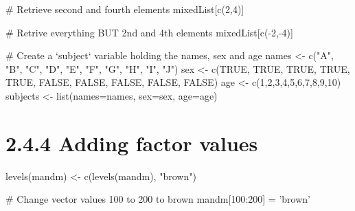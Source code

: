 \documentclass[a4paper]{book}
\newenvironment{Shaded}{}{}
\newcommand{\KeywordTok}[1]{\textcolor[rgb]{0.00,0.00,1.00}{{#1}}}
\newcommand{\DataTypeTok}[1]{{#1}}
\newcommand{\DecValTok}[1]{{#1}}
\newcommand{\StringTok}[1]{\textcolor[rgb]{0.00,0.50,0.50}{{#1}}}
\newcommand{\CommentTok}[1]{\textcolor[rgb]{0.00,0.50,0.00}{{#1}}}
\newcommand{\OtherTok}[1]{\textcolor[rgb]{1.00,0.25,0.00}{{#1}}}
\newcommand{\NormalTok}[1]{{#1}}
\newlength{\leftbarwidth}
\newlength{\leftbarsep}
\newcommand*{\leftbarcolorcmd}{\color{darkgray}}%
\renewenvironment{leftbar}{%
    \def\FrameCommand{{\leftbarcolorcmd{\vrule width \leftbarwidth\relax\hspace {\leftbarsep}}}}%
    \MakeFramed {\advance \hsize -\width \FrameRestore }%
}{%
    \endMakeFramed
}
\renewenvironment{Shaded}
{\vspace{0em}\begin{leftbar}\begin{snugshade}}
{\end{snugshade}\end{leftbar}\vspace{0pt}}
\begin{document}
\begin{Shaded}
\begin{Highlighting}[]
\CommentTok{# Retrieve second and fourth elements}
\NormalTok{mixedList[}\KeywordTok{c}\NormalTok{(}\DecValTok{2}\NormalTok{,}\DecValTok{4}\NormalTok{)]}

\CommentTok{# Retrive everything BUT 2nd and 4th elements}
\NormalTok{mixedList[}\KeywordTok{c}\NormalTok{(-}\DecValTok{2}\NormalTok{,-}\DecValTok{4}\NormalTok{)]}

\CommentTok{# Create a `subject` variable holding the names, sex and age}
\NormalTok{names <-}\StringTok{ }\KeywordTok{c}\NormalTok{(}\StringTok{"A"}\NormalTok{, }\StringTok{"B"}\NormalTok{, }\StringTok{"C"}\NormalTok{, }\StringTok{"D"}\NormalTok{, }\StringTok{"E"}\NormalTok{, }\StringTok{"F"}\NormalTok{, }\StringTok{"G"}\NormalTok{, }\StringTok{"H"}\NormalTok{, }\StringTok{"I"}\NormalTok{, }\StringTok{"J"}\NormalTok{)}
\NormalTok{sex <-}\StringTok{ }\KeywordTok{c}\NormalTok{(}\OtherTok{TRUE}\NormalTok{, }\OtherTok{TRUE}\NormalTok{, }\OtherTok{TRUE}\NormalTok{, }\OtherTok{TRUE}\NormalTok{, }\OtherTok{TRUE}\NormalTok{, }\OtherTok{FALSE}\NormalTok{, }\OtherTok{FALSE}\NormalTok{, }\OtherTok{FALSE}\NormalTok{, }\OtherTok{FALSE}\NormalTok{, }\OtherTok{FALSE}\NormalTok{)}
\NormalTok{age <-}\StringTok{ }\KeywordTok{c}\NormalTok{(}\DecValTok{1}\NormalTok{,}\DecValTok{2}\NormalTok{,}\DecValTok{3}\NormalTok{,}\DecValTok{4}\NormalTok{,}\DecValTok{5}\NormalTok{,}\DecValTok{6}\NormalTok{,}\DecValTok{7}\NormalTok{,}\DecValTok{8}\NormalTok{,}\DecValTok{9}\NormalTok{,}\DecValTok{10}\NormalTok{)}
\NormalTok{subjects <-}\StringTok{ }\KeywordTok{list}\NormalTok{(}\DataTypeTok{names=}\NormalTok{names, }\DataTypeTok{sex=}\NormalTok{sex, }\DataTypeTok{age=}\NormalTok{age)}
\end{Highlighting}
\end{Shaded}

\section*{2.4.4 Adding factor values}\label{adding-factor-values}

\begin{Shaded}
\begin{Highlighting}[]
\KeywordTok{levels}\NormalTok{(mandm) <-}\StringTok{ }\KeywordTok{c}\NormalTok{(}\KeywordTok{levels}\NormalTok{(mandm), }\StringTok{"brown"}\NormalTok{)}

\CommentTok{# Change vector values 100 to 200 to brown}
\NormalTok{mandm[}\DecValTok{100}\NormalTok{:}\DecValTok{200}\NormalTok{] =}\StringTok{ 'brown'}
\end{Highlighting}
\end{Shaded}
\end{document}
